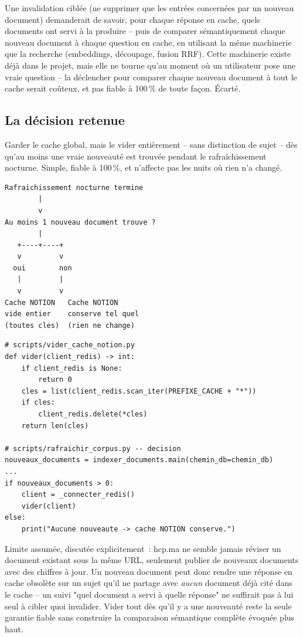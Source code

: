 \documentclass[11pt,a4paper]{article}
\begin{document}
Une invalidation cibl\'ee (ne supprimer que les entr\'ees concern\'ees par un nouveau
document) demanderait de savoir, pour chaque r\'eponse en cache, quels documents ont
servi \`a la produire -- puis de comparer s\'emantiquement chaque nouveau document \`a
chaque question en cache, en utilisant la m\^eme machinerie que la recherche
(embeddings, d\'ecoupage, fusion RRF). Cette machinerie existe d\'ej\`a dans le projet,
mais elle ne tourne qu'au moment o\`u un utilisateur pose une vraie question -- la
d\'eclencher pour comparer chaque nouveau document \`a tout le cache serait co\^uteux, et
pas fiable \`a 100\,\% de toute fa\c{c}on. \'Ecart\'e.

\subsection{La d\'ecision retenue}

Garder le cache global, mais le vider enti\`erement -- sans distinction de sujet --
d\`es qu'au moins une vraie nouveaut\'e est trouv\'ee pendant le rafra\^ichissement
nocturne. Simple, fiable \`a 100\,\%, et n'affecte pas les nuits o\`u rien n'a chang\'e.

\begin{lstlisting}[style=diagstyle]
Rafraichissement nocturne termine
        |
        v
Au moins 1 nouveau document trouve ?
        |
   +----+----+
   v         v
  oui        non
   |         |
   v         v
Cache NOTION   Cache NOTION
vide entier    conserve tel quel
(toutes cles)  (rien ne change)
\end{lstlisting}

\begin{lstlisting}
# scripts/vider_cache_notion.py
def vider(client_redis) -> int:
    if client_redis is None:
        return 0
    cles = list(client_redis.scan_iter(PREFIXE_CACHE + "*"))
    if cles:
        client_redis.delete(*cles)
    return len(cles)

# scripts/rafraichir_corpus.py -- decision
nouveaux_documents = indexer_documents.main(chemin_db=chemin_db)
...
if nouveaux_documents > 0:
    client = _connecter_redis()
    vider(client)
else:
    print("Aucune nouveaute -> cache NOTION conserve.")
\end{lstlisting}

Limite assum\'ee, discut\'ee explicitement~: hcp.ma ne semble jamais r\'eviser un
document existant sous la m\^eme URL, seulement publier de nouveaux documents avec des
chiffres \`a jour. Un nouveau document peut donc rendre une r\'eponse en cache obsol\`ete
sur un sujet qu'il ne partage avec \emph{aucun} document d\'ej\`a cit\'e dans le cache --
un suivi "quel document a servi \`a quelle r\'eponse" ne suffirait pas \`a lui seul \`a
cibler quoi invalider. Vider tout d\`es qu'il y a une nouveaut\'e reste la seule
garantie fiable sans construire la comparaison s\'emantique compl\`ete \'evoqu\'ee
plus haut.
\end{document}
